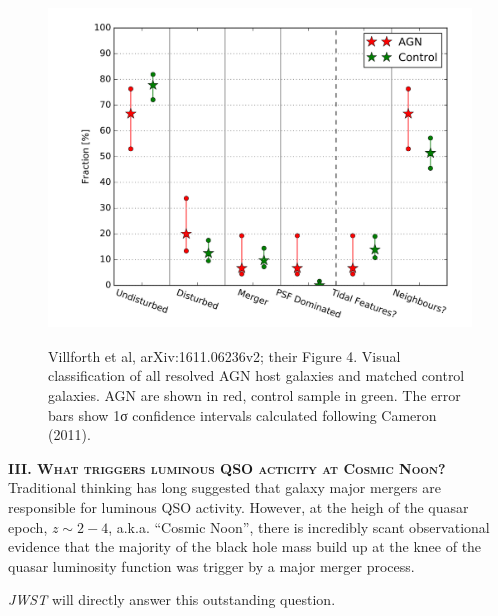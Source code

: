 \documentclass[11pt,epsf]{article}
\begin{document}
\medskip
\medskip


\begin{figure}[h]
  \begin{center}
   \hspace{-0.5cm}
    \includegraphics[height=8.5cm,width=12.2cm]
   {figs/Villforth_161106236v2_Fig4_right.png}
    \vspace{-10pt}
   \caption{Villforth et al, arXiv:1611.06236v2; their Figure 4. 
     Visual classification of all resolved AGN host galaxies and
     matched control galaxies. AGN are shown in red, control sample in
     green. The error bars show 1σ confidence intervals calculated
     following Cameron (2011).}
  \vspace{-14pt}
 \label{figtest-fig}
\end{center}
\end{figure}

\smallskip
\smallskip
\noindent
\textbf{\textsc{III. What triggers luminous QSO acticity at Cosmic Noon?}} 
Traditional thinking has long suggested that galaxy major mergers are responsible 
for luminous QSO activity. However, at the heigh of the quasar epoch, $z\sim2-4$, 
a.k.a. ``Cosmic Noon'', there is incredibly scant observational evidence that 
the majority of the black hole mass build up at the knee of the quasar luminosity 
function was trigger by a major merger process. 

\noindent
{\it JWST} will directly answer this outstanding question. 
\end{document}
